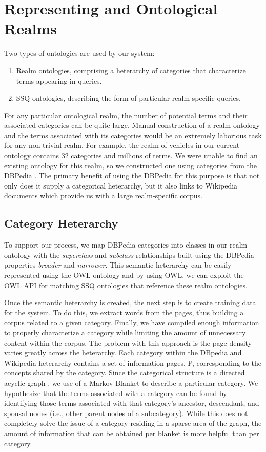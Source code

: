 \section{Representing and Ontological Realms}
Two types of ontologies are used by our system:
\begin{enumerate}
\item Realm ontologies, comprising a heterarchy of categories that
  characterize terms appearing in queries.
\item SSQ ontologies, describing the form of particular
  realm-specific queries.
\end{enumerate}
For any particular ontological realm, the number of potential
terms and their associated categories can be quite large.
Manual construction of a realm ontology and the terms associated
with its categories would be an extremely laborious task
for any non-trivial realm. For example, the realm of vehicles
in our current ontology contains 32 categories and millions of terms.
We were unable to find
an existing ontology for this realm, so we constructed one
using categories from the DBPedia \cite{Auer07dbpedia:a}.
The primary benefit of using the DBPedia for this purpose is
that not only does it supply a categorical heterarchy, but it
also links to Wikipedia documents which provide us with a large
realm-specific corpus.

\subsection{Category Heterarchy} 

To support our process, we map DBPedia categories into classes in our
realm ontology with the \textit{superclass} and \textit{subclass}
relationships built using the DBPedia properties \textit{broader} and
\textit{narrower}. This semantic heterarchy can be easily represented
using the OWL ontology and by using OWL, we can exploit the OWL API
for matching SSQ ontologies that reference these realm ontologies.



Once the semantic heterarchy is created, the next step is to create
training data for the system. To do this, we extract words from the pages,
thus building a corpus related to a given category.
Finally, we have compiled enough information to properly characterize
a category while limiting the
amount of unnecessary content within the corpus. The problem with this
approach is the page density varies greatly across the
heterarchy. Each category within the DBpedia and Wikipedia heterarchy
contains a set of information pages, P, corresponding to the concepts
shared by the category. Since the categorical structure is a directed
acyclic graph \cite{Suchanek07yago:a}, we use of a Markov Blanket
\cite{Friedman97bayesiannetwork} to describe a particular
category. We hypothesize that the terms associated with a category
can be found by identifying those terms associated with that category's
ancestor, descendant, and spousal nodes (i.e., other parent nodes of a subcategory). While this does not completely solve the
issue of a category residing in a sparse area of the graph, the amount
of information that can be obtained per blanket is more
helpful than per category.

